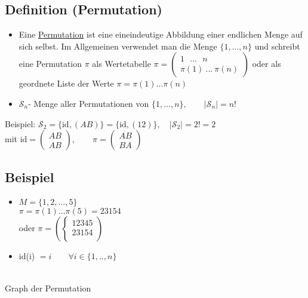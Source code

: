 \documentclass[12pt,titlepage, pdf]{article}
\newcommand{\uline}[1]{\underline{#1}}
\newcommand{\id}{\textrm{id}}
\renewcommand{\>}{\rightarrow}
\renewcommand{\*}{\cdot}
\begin{document}
	\subsection{Definition (Permutation)}	
	\begin{itemize}
		\item Eine \uline{Permutation} ist eine eineindeutige Abbildung einer endlichen Menge auf sich selbst. Im Allgemeinen verwendet man die Menge $\{1,...,n\}$ und schreibt eine Permutation $\pi$ als Wertetabelle $\pi = \begin{pmatrix}
		1~~~...~~~n\\\pi(1)~...~\pi(n)
		\end{pmatrix}$ oder als geordnete Liste der Werte $\pi = \pi(1)... \pi(n)$ 
		\item $\mathscr{S}_n$- Menge aller Permutationen von $\{1,...,n \},\qquad | \mathscr{S}_n| = n!$
	\end{itemize}
	Beispiel: $\mathscr{S}_2=\{\id,(AB)\}=\{\id,(12)\},\quad|\mathscr{S}_2|=2!=2$\\ mit $\id=\begin{pmatrix}
	AB\\AB
	\end{pmatrix},\qquad \pi=\begin{pmatrix}
	AB\\BA
	\end{pmatrix}$
	\subsection{Beispiel}
	\begin{minipage}[c]{0.5\textwidth}
		\begin{itemize}
			\item $M = \{1,2,...,5\}$ \\
			$\pi = \pi(1)...\pi(5) = 23154$\\
			oder $\pi = (\begin{cases}
			12345 \\
			23154 \\
			\end{cases})$
			\item id(i) $= i \qquad \forall i \in \{1,..,n\}$
		\end{itemize}
	\end{minipage}
	\begin{minipage}[c]{0.5\textwidth}
		\\
		Graph der Permutation
	\end{minipage}
\end{document}
